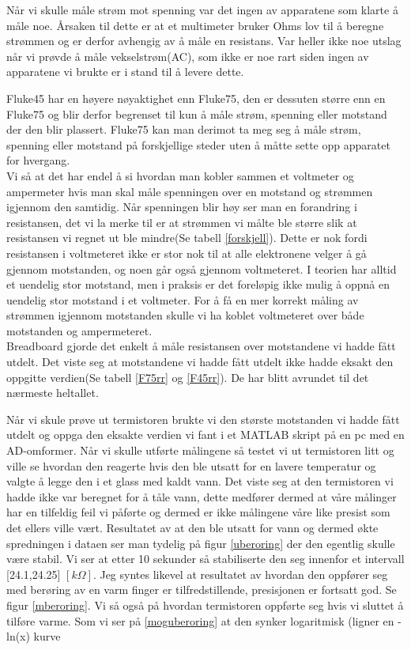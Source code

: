 \documentclass[norsk,a4paper,12pt]{article}
\begin{document}
Når vi skulle måle strøm mot spenning var det ingen av apparatene som klarte å måle noe. Årsaken til dette er at et multimeter bruker Ohms lov til å beregne strømmen og er derfor avhengig av å måle en resistans. Var heller ikke noe utslag når vi prøvde å måle vekselstrøm(AC), som ikke er noe rart siden ingen av apparatene vi brukte er i stand til å levere dette.

Fluke45 har en høyere nøyaktighet enn Fluke75, den er dessuten større enn en Fluke75 og blir derfor begrenset til kun å måle strøm, spenning eller motstand der den blir plassert. Fluke75 kan man derimot ta meg seg å måle strøm, spenning eller motstand på forskjellige steder uten å måtte sette opp apparatet for hvergang. \\

Vi så at det har endel å si hvordan man kobler sammen et voltmeter og ampermeter hvis man skal måle spenningen over en motstand og strømmen igjennom den samtidig. Når spenningen blir høy ser man en forandring i resistansen, det vi la merke til er at strømmen vi målte ble større slik at resistansen vi regnet ut ble mindre(Se tabell \vref{forskjell}). Dette er nok fordi resistansen i voltmeteret ikke er stor nok til at alle elektronene velger å gå gjennom motstanden, og noen går også gjennom voltmeteret. I teorien har alltid et uendelig stor motstand, men i praksis er det foreløpig ikke mulig å oppnå en uendelig stor motstand i et voltmeter. For å få en mer korrekt måling av strømmen igjennom motstanden skulle vi ha koblet voltmeteret over både motstanden og ampermeteret.\\

Breadboard gjorde det enkelt å måle resistansen over motstandene vi hadde fått utdelt. Det viste seg at motstandene vi hadde fått utdelt ikke hadde eksakt den oppgitte verdien(Se tabell \ref{F75rr} og \vref{F45rr}). De har blitt avrundet til det nærmeste heltallet.

Når vi skule prøve ut termistoren brukte vi den største motstanden vi hadde fått utdelt og oppga den eksakte verdien vi fant i et MATLAB skript på en pc med en AD-omformer. Når vi skulle utførte målingene så testet vi ut termistoren litt og ville se hvordan den reagerte hvis den ble utsatt for en lavere temperatur og valgte å legge den i et glass med kaldt vann. Det viste seg at den termistoren vi hadde ikke var beregnet for å tåle vann, dette medfører dermed at våre målinger har en tilfeldig feil vi påførte og dermed er ikke målingene våre like presist som det ellers ville vært. Resultatet av at den ble utsatt for vann og dermed økte spredningen i dataen ser man tydelig på figur \vref{uberoring} der den egentlig skulle være stabil. Vi ser at etter 10 sekunder så stabiliserte den seg innenfor et intervall [24.1,24.25] $[k\Omega]$. Jeg syntes likevel at resultatet av hvordan den oppfører seg med berøring av en varm finger er tilfredstillende, presisjonen er fortsatt god. Se figur \vref{mberoring}. Vi så også på hvordan termistoren oppførte seg hvis vi sluttet å tilføre varme. Som vi ser på \vref{moguberoring} at den synker logaritmisk (ligner en -ln(x) kurve \cite{snl}
\end{document}
